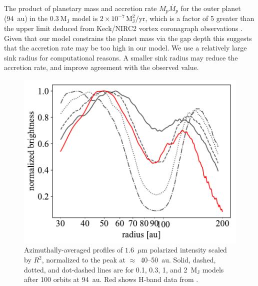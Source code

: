 \documentclass[usenatbib,a4paper,times]{mnras}
\begin{document}
The product of planetary mass and accretion rate $M_p\dot{M_p}$ for the outer
planet (94~au) in the $0.3~\mathrm{M_J}$ model is $2\times 10^{-7}\,
\mathrm{M_J^2/yr}$, which is a factor of 5 greater than the upper limit deduced
from Keck/NIRC2 vortex coronagraph observations \citep{ruane:2017}. Given that
our model constrains the planet mass via the gap depth this suggests that the
accretion rate may be too high in our model. We use a relatively large sink
radius for computational reasons. A smaller sink radius may reduce the accretion
rate, and improve agreement with the observed value.

\begin{figure}
   \begin{center}
      \includegraphics[width=1.00\columnwidth]{figs/scattered-radial.pdf}
      \caption{Azimuthally-averaged profiles of $1.6$~$\mu$m polarized intensity
         scaled by $R^2$, normalized to the peak at $\approx$~40--50~au. Solid,
         dashed, dotted, and dot-dashed lines are for 0.1, 0.3, 1, and
         2~$\mathrm{M_J}$ models after 100 orbits at 94~au. Red shows H-band
         data from \citet{van-boekel:2017}.\label{fig:scattered-radial}}
   \end{center}
\end{figure}
\end{document}
